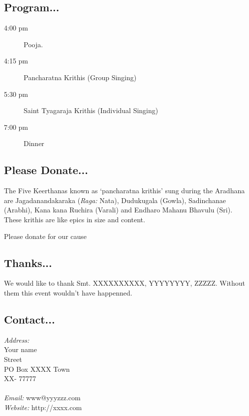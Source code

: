 \documentclass[10pt,letterpaper,twocolumn,landscape]{article}
\begin{document}
\begin{framed}

\subsection*{Program...}
\begin{description}
\item[4:00 pm] Pooja. 
\item[4:15 pm] Pancharatna Krithis (Group Singing)
\item[5:30 pm] Saint Tyagaraja Krithis (Individual Singing)
\item[7:00 pm] Dinner  
\end{description}


\subsection*{Please Donate...}
The Five Keerthanas known as ‘pancharatna krithis’ 
sung during the Aradhana are Jagadanandakaraka ({\em Raga:} Nata), 
Dudukugala (Gowla), Sadinchanae (Arabhi), 
Kana kana Ruchira (Varali) and Endharo Mahanu Bhavulu (Sri).
These krithis are like epics in size and content.

Please donate for our cause


\subsection*{Thanks...}
We would like to thank Smt. XXXXXXXXXX,
YYYYYYYY, ZZZZZ. Without them this event 
wouldn't have happenned.


\subsection*{Contact...}
{\em Address:}\\
Your name\\
Street\\
PO Box XXXX Town\\
XX- 77777\\\\
{\em Email:} www@yyyzzz.com\\
{\em Website:} http://xxxx.com

\end{framed}


\newpage

\end{document}

